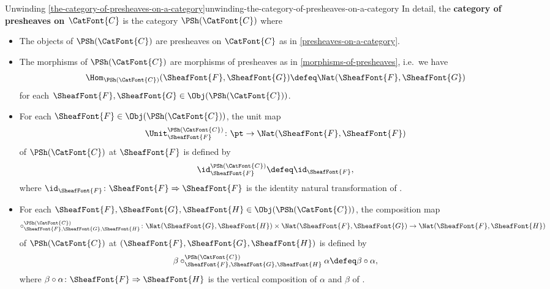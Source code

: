 \begin{remark}{Unwinding \cref{the-category-of-presheaves-on-a-category}}{unwinding-the-category-of-presheaves-on-a-category}%
    In detail, the \textbf{category of presheaves on $\CatFont{C}$} is the category $\PSh(\CatFont{C})$ where
    \begin{itemize}
        \item{}The objects of $\PSh(\CatFont{C})$ are presheaves on $\CatFont{C}$ as in \cref{presheaves-on-a-category}.
        \item{}The morphisms of $\PSh(\CatFont{C})$ are morphisms of presheaves as in \cref{morphisms-of-presheaves}, i.e.\ we have
            \[
                \Hom_{\PSh(\CatFont{C})}(\SheafFont{F},\SheafFont{G})%
                \defeq%
                \Nat(\SheafFont{F},\SheafFont{G})%
            \]%
            for each $\SheafFont{F},\SheafFont{G}\in\Obj(\PSh(\CatFont{C}))$.
        \item{}For each $\SheafFont{F}\in\Obj(\PSh(\CatFont{C}))$, the unit map
            \[
                \Unit^{\PSh(\CatFont{C})}_{\SheafFont{F}}%
                \colon%
                \pt%
                \to%
                \Nat(\SheafFont{F},\SheafFont{F})%
            \]%
            of $\PSh(\CatFont{C})$ at $\SheafFont{F}$ is defined by
            \[
                \id^{\PSh(\CatFont{C})}_{\SheafFont{F}}
                \defeq
                \id_{\SheafFont{F}},%
            \]%
            where $\id_{\SheafFont{F}}\colon\SheafFont{F}\Rightarrow\SheafFont{F}$ is the identity natural transformation of .
        \item{}For each $\SheafFont{F},\SheafFont{G},\SheafFont{H}\in\Obj(\PSh(\CatFont{C}))$, the composition map
            \[
                \circ^{\PSh(\CatFont{C})}_{\SheafFont{F},\SheafFont{G},\SheafFont{H}}
                \colon
                \Nat(\SheafFont{G},\SheafFont{H})
                \times
                \Nat(\SheafFont{F},\SheafFont{G})
                \to
                \Nat(\SheafFont{F},\SheafFont{H})
            \]%
            of $\PSh(\CatFont{C})$ at $(\SheafFont{F},\SheafFont{G},\SheafFont{H})$ is defined by
            \[
                \beta\circ^{\PSh(\CatFont{C})}_{\SheafFont{F},\SheafFont{G},\SheafFont{H}}\alpha%
                \defeq
                \beta\circ\alpha,%
            \]%
            where $\beta\circ\alpha\colon\SheafFont{F}\Rightarrow\SheafFont{H}$ is the vertical composition of $\alpha$ and $\beta$ of .
    \end{itemize}
\end{remark}
